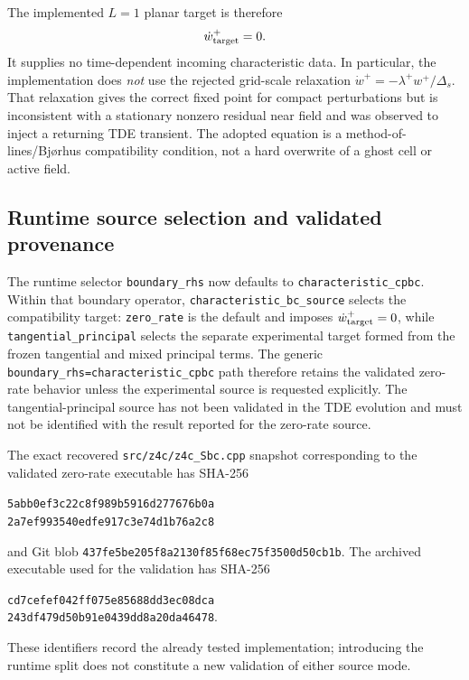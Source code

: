 \documentclass[11pt]{article}
\begin{document}
The implemented \(L=1\) planar target is therefore
\[
 \dot w^+_{\rm target}=0.
\]
It supplies no time-dependent incoming characteristic data.  In particular,
the implementation does \emph{not} use the rejected grid-scale relaxation
\(\dot w^+=-\lambda^+w^+/\Delta_s\).  That relaxation gives the correct fixed
point for compact perturbations but is inconsistent with a stationary
nonzero residual near field and was observed to inject a returning TDE
transient.  The adopted equation is a method-of-lines/Bj{\o}rhus
compatibility condition, not a hard overwrite of a ghost cell or active
field.

\subsection{Runtime source selection and validated provenance}

The runtime selector \texttt{boundary\_rhs} now defaults to
\texttt{characteristic\_cpbc}.  Within that boundary operator,
\texttt{characteristic\_bc\_source} selects the compatibility target:
\texttt{zero\_rate} is the default and imposes
\(\dot w^+_{\rm target}=0\), while
\texttt{tangential\_principal} selects the separate experimental target
formed from the frozen tangential and mixed principal terms.  The generic
\texttt{boundary\_rhs=characteristic\_cpbc} path therefore retains the
validated zero-rate behavior unless the experimental source is requested
explicitly.  The tangential-principal source has not been validated in the
TDE evolution and must not be identified with the result reported for the
zero-rate source.

The exact recovered \texttt{src/z4c/z4c\_Sbc.cpp} snapshot corresponding to
the validated zero-rate executable has SHA-256
\begin{center}
\texttt{5abb0ef3c22c8f989b5916d277676b0a}\\
\texttt{2a7ef993540edfe917c3e74d1b76a2c8}
\end{center}
and Git blob \texttt{437fe5be205f8a2130f85f68ec75f3500d50cb1b}.
The archived executable used for the validation has SHA-256
\begin{center}
\texttt{cd7cefef042ff075e85688dd3ec08dca}\\
\texttt{243df479d50b91e0439dd8a20da46478}.
\end{center}
These identifiers record the already tested implementation; introducing the
runtime split does not constitute a new validation of either source mode.
\end{document}
